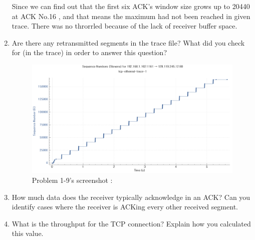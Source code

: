 \begin{enumerate}[label=\bfseries Problem \arabic*:,leftmargin=*,labelindent=1em]
        Since we can find out that the first six ACK’s window size grows up to 20440 at ACK No.16 , and that means the maximum had not been reached in given trace. There was no throrrled because of the lack of receiver buffer space.
        \item Are there any retransmitted segments in the trace file? What did you check for (in the trace) in order to answer this question?\\[0.2mm]
        \soln
        \begin{figure}[!h]\centering
        \hspace{15mm}  
    		\includegraphics[width=.8\textwidth]{image/week02/1-9-1.png}
    		\caption{\footnotesize Problem 1-9's screenshot : }
    		\vspace{-10pt}
        \end{figure}
\clearpage
        \item How much data does the receiver typically acknowledge in an ACK? Can you identify cases where the receiver is ACKing every other received segment.\\[0.2mm]
        \soln
        \item What is the throughput for the TCP connection? Explain how you calculated this value.\\[0.2mm]
        \soln
    \end{enumerate}
\newpage